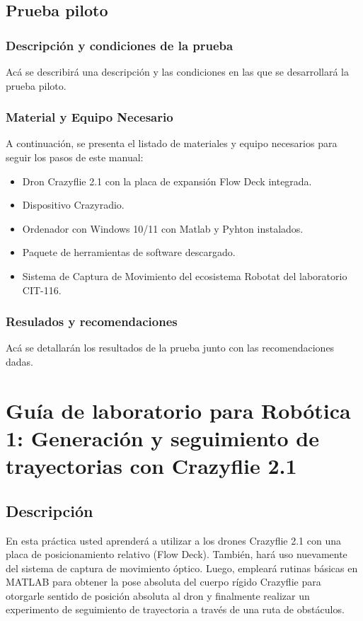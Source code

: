 \subsection{Prueba piloto}
\subsubsection{Descripción y condiciones de la prueba}
Acá se describirá una descripción y las condiciones en las que se desarrollará la prueba piloto.

\subsubsection{Material y Equipo Necesario}
A continuación, se presenta el listado de materiales y equipo necesarios para seguir los pasos de este manual:

\begin{itemize}
	\item Dron Crazyflie 2.1 con la placa de expansión Flow Deck integrada.
	\item Dispositivo Crazyradio.
	\item Ordenador con Windows 10/11 con Matlab y Pyhton instalados.
	\item Paquete de herramientas de software descargado.
	\item Sistema de Captura de Movimiento del ecosistema Robotat del laboratorio CIT-116.
\end{itemize}

\subsubsection{Resulados y recomendaciones}
Acá se detallarán los resultados de la prueba junto con las recomendaciones dadas. 

\newpage
\section{Guía de laboratorio para Robótica 1: Generación y seguimiento de trayectorias con Crazyflie 2.1}
\subsection{Descripción}
En esta práctica usted aprenderá a utilizar a los drones Crazyflie 2.1 con una placa de posicionamiento relativo (Flow Deck). También, hará uso nuevamente del sistema de captura de movimiento óptico. Luego, empleará rutinas básicas en MATLAB para obtener la pose absoluta del cuerpo rígido Crazyflie para otorgarle sentido de posición absoluta al dron y finalmente realizar un experimento de seguimiento de trayectoria a través de una ruta de obstáculos.

